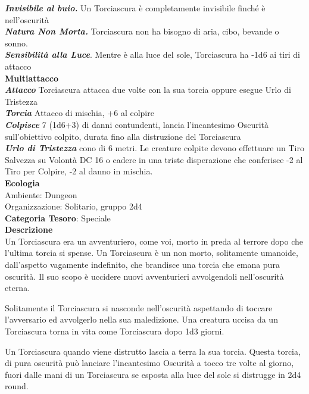 \begin{multicols}{2}
{\emph{\textbf{Invisibile al buio.}} Un Torciascura è completamente invisibile finché è nell'oscurità\\
\emph{\textbf{Natura Non Morta.}} Torciascura non ha bisogno di aria, cibo, bevande o sonno.\\
\emph{\textbf{Sensibilità alla Luce}}. Mentre è alla luce del sole, Torciascura ha -1d6 ai tiri di attacco\\
\textbf{Multiattacco}\\
\emph{\textbf{Attacco}} Torciascura attacca due volte con la sua torcia oppure esegue Urlo di Tristezza\\
\emph{\textbf{Torcia}} Attacco di mischia, +6 al colpire\\
\emph{\textbf{Colpisce}} 7 (1d6+3) di danni contundenti, lancia l'incantesimo Oscurità sull'obiettivo colpito, durata fino alla distruzione del Torciascura\\
\emph{\textbf{Urlo di Tristezza}} cono di 6 metri. Le creature colpite devono effettuare un Tiro Salvezza su Volontà DC 16 o cadere in una triste disperazione che conferisce -2 al Tiro per Colpire, -2 al danno in mischia.\\
\textbf{Ecologia}\\
Ambiente: Dungeon\\
Organizzazione: Solitario, gruppo 2d4\\
\textbf{Categoria Tesoro}: Speciale\\
\textbf{Descrizione}\\
Un Torciascura era un avventuriero, come voi, morto in preda al terrore dopo che l'ultima torcia si spense. Un Torciascura è un non morto, solitamente umanoide, dall'aspetto vagamente indefinito, che brandisce una torcia che emana pura oscurità. Il suo scopo è uccidere nuovi avventurieri avvolgendoli nell'oscurità eterna.

Solitamente il Torciascura si nasconde nell'oscurità aspettando di toccare l'avversario ed avvolgerlo nella sua maledizione. Una creatura uccisa da un Torciascura torna in vita come Torciascura dopo 1d3 giorni.

Un Torciascura quando viene distrutto lascia a terra la sua torcia. Questa torcia, di pura oscurità può lanciare l'incantesimo Oscurità a tocco tre volte al giorno, fuori dalle mani di un Torciascura se esposta alla luce del sole si distrugge in 2d4 round.

}
\end{multicols}
